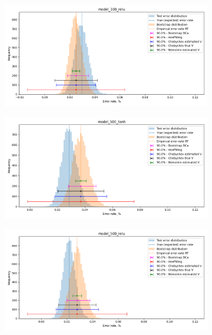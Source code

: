 \documentclass[a4paper,11pt]{article}
\begin{document}
\begin{figure}[ht]
\begin{subfigure}[b]{0.45\textwidth}
    \end{subfigure}
    \hfill
    \begin{subfigure}[b]{0.45\textwidth}
        \includegraphics[width=\textwidth]{../errors/model_100_relu.png}
    \end{subfigure}
    \begin{subfigure}[b]{0.45\textwidth}
        \includegraphics[width=\textwidth]{../errors/model_500_tanh.png}
    \end{subfigure}
    \hfill
    \begin{subfigure}[b]{0.45\textwidth}
        \includegraphics[width=\textwidth]{../errors/model_500_relu.png}
    \end{subfigure}
\end{figure}
\end{document}
